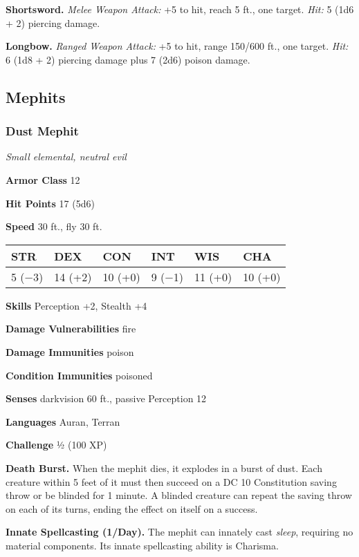 \documentclass[
]{article}
\begin{document}
\textbf{Shortsword.} \emph{Melee Weapon Attack:} +5 to hit, reach 5 ft.,
one target. \emph{Hit:} 5 (1d6 + 2) piercing damage.

\textbf{Longbow.} \emph{Ranged Weapon Attack:} +5 to hit, range 150/600
ft., one target. \emph{Hit:} 6 (1d8 + 2) piercing damage plus 7 (2d6)
poison damage.

\hypertarget{mephits}{%
\subsection{Mephits}\label{mephits}}

\hypertarget{dust-mephit}{%
\subsubsection{Dust Mephit}\label{dust-mephit}}

\emph{Small elemental, neutral evil}

\textbf{Armor Class} 12

\textbf{Hit Points} 17 (5d6)

\textbf{Speed} 30 ft., fly 30 ft.

\begin{longtable}[]{@{}llllll@{}}
\toprule
STR & DEX & CON & INT & WIS & CHA\tabularnewline
\midrule
\endhead
5 (−3) & 14 (+2) & 10 (+0) & 9 (−1) & 11 (+0) & 10 (+0)\tabularnewline
\bottomrule
\end{longtable}

\textbf{Skills} Perception +2, Stealth +4

\textbf{Damage Vulnerabilities} fire

\textbf{Damage Immunities} poison

\textbf{Condition Immunities} poisoned

\textbf{Senses} darkvision 60 ft., passive Perception 12

\textbf{Languages} Auran, Terran

\textbf{Challenge} ½ (100 XP)

\textbf{Death Burst.} When the mephit dies, it explodes in a burst of
dust. Each creature within 5 feet of it must then succeed on a DC 10
Constitution saving throw or be blinded for 1 minute. A blinded creature
can repeat the saving throw on each of its turns, ending the effect on
itself on a success.

\textbf{Innate Spellcasting (1/Day).} The mephit can innately cast
\emph{sleep}, requiring no material components. Its innate spellcasting
ability is Charisma.
\end{document}

